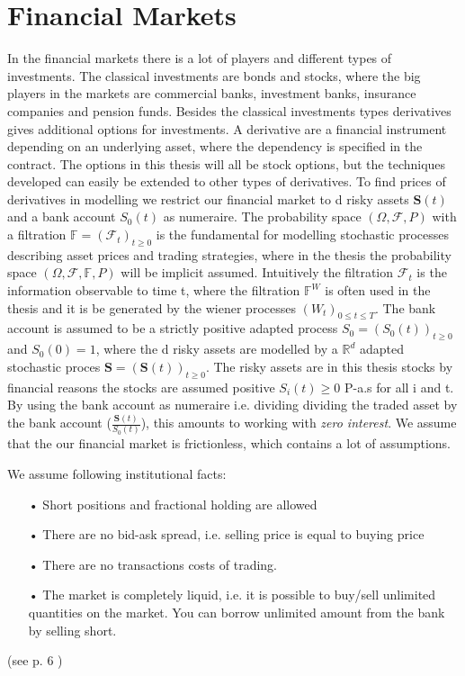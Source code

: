 \section{Financial Markets}\label{FinMarket}
In the financial markets there is a lot of players and different types of investments. The classical investments are bonds and stocks, where the big players in the markets are commercial banks, investment banks, insurance companies and pension funds. Besides the classical investments types derivatives gives additional options for investments. A derivative are a financial instrument depending on an underlying asset, where the dependency is specified in the contract. The options in this thesis will all be stock options, but the techniques developed can easily be extended to other types of derivatives. To find prices of derivatives in modelling we restrict our financial market to d risky assets $\bm{S}(t)$ and a bank account $S_0(t)$ as numeraire. The probability space $(\Omega, \mathcal{F}, P)$ with a filtration $\mathbb{F}=(\mathcal{F}_t)_{t\geq 0}$ is the fundamental for modelling stochastic processes describing asset prices and trading strategies, where in the thesis the probability space $(\Omega, \mathcal{F}, \mathbb{F}, P)$ will be implicit assumed. Intuitively the filtration $\mathcal{F}_t$ is the information observable to time t, where the filtration $\mathbb{F}^{W}$ is often used in the thesis and it is be generated by the wiener processes $(W_t)_{0\leq t \leq T}$. The bank account is assumed to be a strictly positive adapted process $S_0=(S_0 (t))_{t \geq 0}$ and $S_0(0)=1$, where the d risky assets are modelled by a $\mathbb{R}^d$ adapted stochastic proces $\bm{S}=(\bm{S}(t))_{t\geq 0}$. The risky assets are in this thesis stocks by financial reasons the stocks are assumed positive $S_i(t)\geq 0$ P-a.s for all i and t. By using the bank account as numeraire i.e. dividing dividing the traded asset by the bank account ($\frac{\bm{S}(t)}{S_0 (t)}$), this amounts to working with \textit{zero interest}. We assume that the our financial market is frictionless, which contains a lot of assumptions.
\theoremstyle{assumption}
\begin{assumption}{}\label{EfficientMarket}
We assume following institutional facts:
\begin{enumerate}
\item[•] Short positions and fractional holding are allowed 
\item[•] There are no bid-ask spread, i.e. selling price is equal to buying price
\item[•] There are no transactions costs of trading.
\item[•] The market is completely liquid, i.e. it is possible to buy/sell unlimited quantities on the market. You can borrow unlimited amount from the bank by selling short.
\end{enumerate}
(see p. 6 \parencite{finKont})
\end{assumption}
